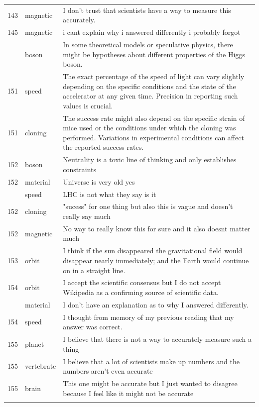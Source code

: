 \documentclass[
  doc,floatsintext]{apa6}
\begin{document}
\begin{longtable}[t]{>{}r>{}l>{\raggedright\arraybackslash}p{30em}}
143 & magnetic & I don't trust that scientists have a way to measure this accurately.\\
145 & magnetic & i cant explain why i answered differently i probably forgot\\
\addlinespace
151 & boson & In some theoretical models or speculative physics, there might be hypotheses about different properties of the Higgs boson.\\
151 & speed & The exact percentage of the speed of light can vary slightly depending on the specific conditions and the state of the accelerator at any given time. Precision in reporting such values is crucial.\\
151 & cloning & The success rate might also depend on the specific strain of mice used or the conditions under which the cloning was performed. Variations in experimental conditions can affect the reported success rates.\\
152 & boson & Neutrality is a toxic line of thinking and only establishes constraints\\
152 & material & Universe is very old yes\\
\addlinespace
152 & speed & LHC is not what they say is it\\
152 & cloning & "sucess" for one thing but also this is vague and doesn't really say much\\
152 & magnetic & No way to really know this for sure and it also doesnt matter much\\
153 & orbit & I think if the sun disappeared the gravitational field would disappear nearly immediately; and the Earth would continue on in a straight line.\\
154 & orbit & I accept the scientific consensus but I do not accept Wikipedia as a confirming source of scientific data.\\
\addlinespace
154 & material & I don't have an explanation as to why I answered differently.\\
154 & speed & I thought from memory of my previous reading that my answer was correct.\\
155 & planet & I believe that there is not a way to accurately measure such a thing\\
155 & vertebrate & I believe that a lot of scientists make up numbers and the numbers aren't even accurate\\
155 & brain & This one might be accurate but I just wanted to disagree because I feel like it might not be accurate\\
\addlinespace

\end{longtable}
\end{document}
